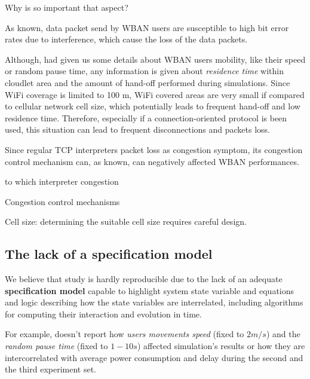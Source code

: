 \documentclass[sigchi]{acmart}
\begin{document}
Why is so important that aspect?

As known, data packet send by WBAN users are susceptible to high bit error rates due to interference, which cause the loss of the data packets.  

Although, \cite{MSAReport} had given us some details about WBAN users mobility, like their speed or random pause time, any information is given about \textit{residence time} within cloudlet area and the amount of hand-off performed during simulations. Since WiFi coverage is limited to 100 m, WiFi covered areas are very small if compared to cellular network cell size, which potentially leads to frequent hand-off and low residence time. Therefore, especially if a connection-oriented protocol is been used, this situation can lead to frequent disconnections and packets loss.

Since regular TCP interpreters packet loss as congestion symptom, its congestion control mechanism can, as known, can negatively affected WBAN performances.














to  which interpreter congestion 

Congestion control mechanisms








Cell size: determining the suitable cell
size requires careful design. 

\subsection{The lack of a specification model}

We believe that \citet{MSAReport} study is hardly reproducible due to the lack of an adequate \textbf{specification model} capable to highlight system state variable and equations and logic describing how the state variables are interrelated, including algorithms for computing their interaction and evolution in time.

For example, \citet{MSAReport} doesn't report how \textit{users movements speed} (fixed to $2 m/s$) and the \textit{random pause time} (fixed to $1-10 s$) affected simulation's results or how they are intercorrelated with average power consumption and delay during the second and the third experiment set.
\end{document}
